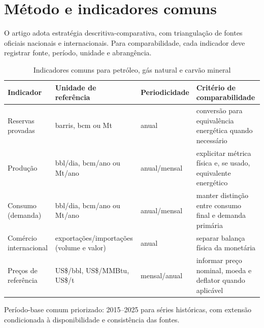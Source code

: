 \section{M\'etodo e indicadores comuns}

O artigo adota estrat\'egia descritiva-comparativa, com triangula\c{c}\~ao de fontes oficiais nacionais e internacionais. Para comparabilidade, cada indicador deve registrar fonte, per\'iodo, unidade e abrang\^encia.

\begin{table}[t]
\centering
\caption{Indicadores comuns para petr\'oleo, g\'as natural e carv\~ao mineral}
\begin{tabular}{p{3.2cm}p{4.0cm}p{2.5cm}p{5.4cm}}
\toprule
Indicador & Unidade de refer\^encia & Periodicidade & Crit\'erio de comparabilidade \\
\midrule
Reservas provadas & barris, bcm ou Mt & anual & convers\~ao para equival\^encia energ\'etica quando necess\'ario \\
Produ\c{c}\~ao & bbl/dia, bcm/ano ou Mt/ano & anual/mensal & explicitar m\'etrica f\'isica e, se usado, equivalente energ\'etico \\
Consumo (demanda) & bbl/dia, bcm/ano ou Mt/ano & anual/mensal & manter distin\c{c}\~ao entre consumo final e demanda prim\'aria \\
Com\'ercio internacional & exporta\c{c}\~oes/importa\c{c}\~oes (volume e valor) & anual & separar balan\c{c}a f\'isica da monet\'aria \\
Pre\c{c}os de refer\^encia & US\$/bbl, US\$/MMBtu, US\$/t & mensal/anual & informar pre\c{c}o nominal, moeda e deflator quando aplic\'avel \\
\bottomrule
\end{tabular}
\end{table}

Per\'iodo-base comum priorizado: 2015--2025 para s\'eries hist\'oricas, com extens\~ao condicionada \`a disponibilidade e consist\^encia das fontes.
